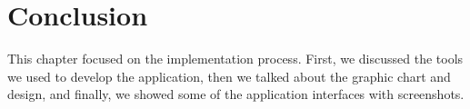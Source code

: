 \section{Conclusion}
This chapter focused on the implementation process. First, we discussed the tools we used to develop the application, then we talked about the graphic chart and design, and finally, we showed some of the application interfaces with screenshots.

